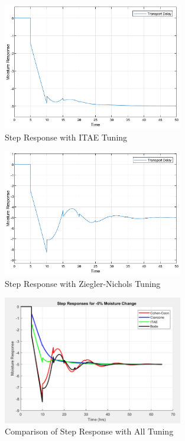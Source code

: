\documentclass[12pt]{article}
\begin{document}
\begin{enumerate}
\begin{enumerate}
    \begin{figure}[H]
      \centering
      \includegraphics[width=0.7\textwidth]{Figures/figure2-3c.png}
      \caption{Step Response with ITAE Tuning}
      \label{fig:figure2_3c}
    \end{figure}

    \begin{figure}[H]
      \centering
      \includegraphics[width=0.7\textwidth]{Figures/figure2-3d.png}
      \caption{Step Response with Ziegler-Nichols Tuning}
      \label{fig:figure2_3d}
    \end{figure}

    \begin{figure}[H]
      \centering
      \includegraphics[width=0.7\textwidth]{Figures/figure2-3e.png}
      \caption{Comparison of Step Response with All Tuning}
      \label{fig:figure2_3e}
    \end{figure}

  

      


    

  \end{enumerate}

\end{enumerate}
\end{document}

